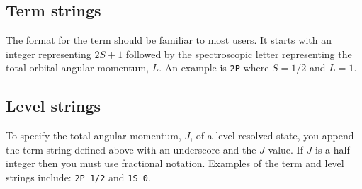 \subsection{Term strings}

The format for the term should be familiar to most users. 
It starts with an integer representing $2S+1$ followed by the spectroscopic
letter representing the total orbital angular momentum, $L$.
An example is {\tt 2P} where $S=1/2$ and $L=1$.


\subsection{Level strings}

To specify the total angular momentum, $J$, of a level-resolved state, you 
append the term string defined above with an underscore and the $J$ value.
If $J$ is a half-integer then you must use fractional notation.
Examples of the term and level strings include: {\tt 2P\_1/2} and {\tt 1S\_0}.



